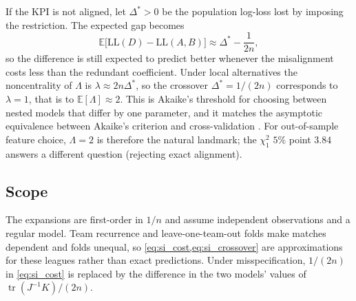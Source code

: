 If the KPI is not aligned, let $\Delta^{*}>0$ be the population log-loss lost by imposing the restriction.
The expected gap becomes
\begin{equation}
  \mathbb{E}\bigl[\mathrm{LL}(D)-\mathrm{LL}(A,B)\bigr]
  \approx\Delta^{*}-\frac{1}{2n},
  \label{eq:si_crossover}
\end{equation}
so the difference is still expected to predict better whenever the misalignment costs less than the redundant coefficient.
Under local alternatives the noncentrality of $\Lambda$ is $\lambda\approx2n\Delta^{*}$, so the crossover $\Delta^{*}=1/(2n)$ corresponds to $\lambda=1$, that is to $\mathbb{E}[\Lambda]\approx 2$.
This is Akaike's threshold for choosing between nested models that differ by one parameter, and it matches the asymptotic equivalence between Akaike's criterion and cross-validation \parencite{stone1977}.
For out-of-sample feature choice, $\Lambda=2$ is therefore the natural landmark; the $\chi^{2}_{1}$ $5\%$ point $3.84$ answers a different question (rejecting exact alignment).

\subsection*{Scope}

The expansions are first-order in $1/n$ and assume independent observations and a regular model.
Team recurrence and leave-one-team-out folds make matches dependent and folds unequal, so \cref{eq:si_cost,eq:si_crossover} are approximations for these leagues rather than exact predictions.
Under misspecification, $1/(2n)$ in \cref{eq:si_cost} is replaced by the difference in the two models' values of $\operatorname{tr}(J^{-1}K)/(2n)$.
